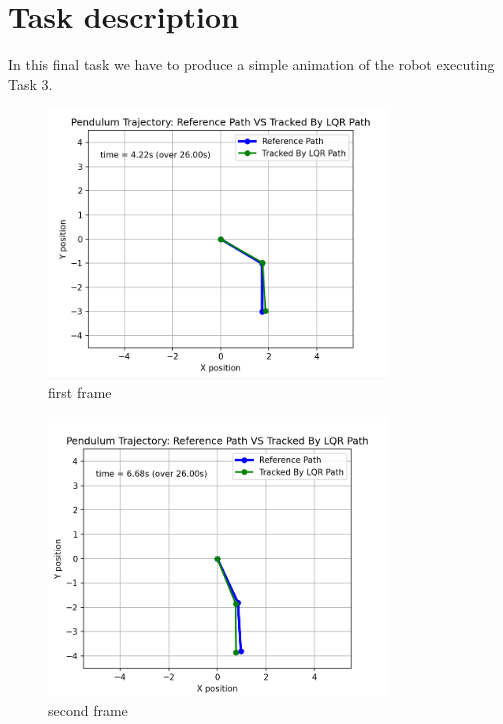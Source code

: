 \documentclass[a4paper,11pt,oneside]{book}
\begin{document}
\section{Task description}
\begin{flushleft}
    {In this final task we have to produce a simple animation of the robot executing Task 3.}
\end{flushleft}
\begin{figure}[H]
    \centering
    \includegraphics[width=0.8\textwidth]{Screenshot 2025-01-23 191508.png}
    \caption{first frame}
    \label{fig:enter-label}
\end{figure}
\begin{figure}[H]
    \centering
    \includegraphics[width=0.8\textwidth]{Screenshot 2025-01-23 191426.png}
    \caption{second frame}
    \label{fig:enter-label}
\end{figure}
\end{document}
